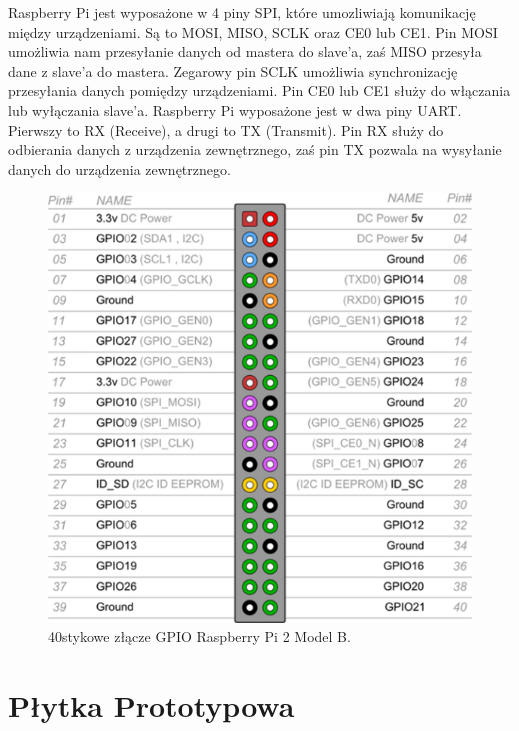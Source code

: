 Raspberry Pi jest wyposażone w 4 piny SPI, które umozliwiają komunikację między urządzeniami. Są to MOSI, MISO, SCLK oraz CE0 lub CE1. Pin MOSI umożliwia nam przesyłanie danych od mastera do slave’a, zaś MISO przesyła dane z slave’a do mastera. Zegarowy pin SCLK umożliwia synchronizację przesyłania danych pomiędzy urządzeniami. Pin CE0 lub CE1 służy do włączania lub wyłączania slave’a. Raspberry Pi wyposażone jest w dwa piny UART. Pierwszy to RX (Receive), a drugi to TX (Transmit). Pin RX służy do odbierania danych z urządzenia zewnętrznego, zaś pin TX pozwala na wysyłanie danych do urządzenia zewnętrznego. 
\begin{figure}[htbp]
	\centering
	\includegraphics[width=0.5\linewidth]{"obrazy/GPIO"}
	\caption{40stykowe złącze GPIO Raspberry Pi 2 Model B.}
	\label{fig:2}
\end{figure}
\newpage
\section{Płytka Prototypowa}

